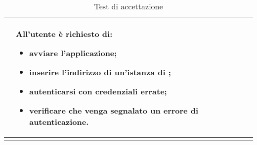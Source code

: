 \begin{longtabu}{| X[0.5] | X | X |}
		& All'utente è richiesto di:
		\begin{itemize}
			\item avviare l'applicazione;
			\item inserire l'indirizzo di un'istanza di \projectname{};
			\item autenticarsi con credenziali errate;
			\item verificare che venga segnalato un errore di autenticazione.
		\end{itemize}
\\ \hline

\caption{Test di accettazione}

\end{longtabu}